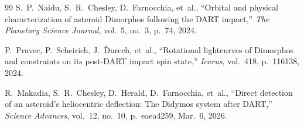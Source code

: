 \documentclass[11pt,a4paper]{article}
\begin{document}
\begin{thebibliography}{99}
S.~P.~Naidu, S.~R.~Chesley, D.~Farnocchia, et~al., ``Orbital and physical characterization of asteroid Dimorphos following the DART impact,'' \textit{The Planetary Science Journal}, vol.~5, no.~3, p.~74, 2024.

P.~Pravec, P.~Scheirich, J.~{\v{D}}urech, et~al., ``Rotational lightcurves of Dimorphos and constraints on its post-DART impact spin state,'' \textit{Icarus}, vol.~418, p.~116138, 2024.

R.~Makadia, S.~R.~Chesley, D.~Herald, D.~Farnocchia, et~al., ``Direct detection of an asteroid's heliocentric deflection: The Didymos system after DART,'' \textit{Science Advances}, vol.~12, no.~10, p.~eaea4259, Mar.~6, 2026.

\end{thebibliography}
\end{document}
